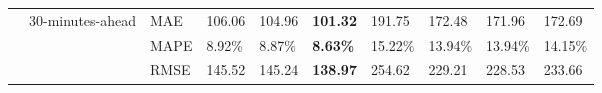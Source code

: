 {\begin{longtable}[htb!]{llllllllll}
                           & {30-minutes-ahead}    & MAE                       & 106.06             & 104.96            & \textbf{101.32}  & 191.75  & 172.48  & 171.96  & 172.69  \\
                           &                                      & MAPE                      & 8.92\%             & 8.87\%            & \textbf{8.63\%}  & 15.22\% & 13.94\% & 13.94\% & 14.15\% \\
                           &                                      & RMSE                      & 145.52             & 145.24            & \textbf{138.97}  & 254.62  & 229.21  & 228.53  & 233.66  \\ \hline
\end{longtable}
}